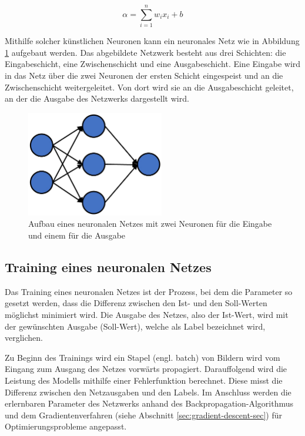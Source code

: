 \begin{equation}\label{eq:uebertragungsfunktion_perzeptron}
\alpha=\sum_{i=1}^{n}w_i x_i + b
\end{equation}

Mithilfe solcher künstlichen Neuronen kann ein neuronales Netz wie in Abbildung \ref{fig:mlp-fig} aufgebaut werden. Das abgebildete Netzwerk besteht aus drei Schichten: die Eingabeschicht, eine Zwischenschicht und eine Ausgabeschicht. Eine Eingabe wird in das Netz über die zwei Neuronen der ersten Schicht eingespeist und an die Zwischenschicht weitergeleitet. Von dort wird sie an die Ausgabeschicht geleitet, an der die Ausgabe des Netzwerks dargestellt wird.

\begin{figure}[h!]
\centering
\includegraphics[width=6cm]{98_images/mlp.png}
\caption{Aufbau eines neuronalen Netzes mit zwei Neuronen für die Eingabe und einem für die Ausgabe}
\label{fig:mlp-fig}
\end{figure}


%
%
\subsection{Training eines neuronalen Netzes}
Das Training eines neuronalen Netzes ist der Prozess, bei dem die Parameter so gesetzt werden, dass die Differenz zwischen den Ist- und den Soll-Werten möglichst minimiert wird. Die Ausgabe des Netzes, also der Ist-Wert, wird mit der gewünschten Ausgabe (Soll-Wert), welche als Label bezeichnet wird, verglichen. \cite{cnns-an-overview-and-application-in-radiology}

\mypar Zu Beginn des Trainings wird ein Stapel (engl. batch) von Bildern wird vom Eingang zum Ausgang des Netzes vorwärts propagiert. Darauffolgend wird die Leistung des Modells mithilfe einer Fehlerfunktion berechnet. Diese misst die Differenz zwischen den Netzausgaben und den Labels. Im Anschluss werden die erlernbaren Parameter des Netzwerks anhand des Backpropagation-Algorithmus \cite{rumelhart1985learning} und dem Gradientenverfahren (siehe Abschnitt \ref{sec:gradient-descent-sec}) für Optimierungsprobleme angepasst. \cite{cnns-an-overview-and-application-in-radiology}

